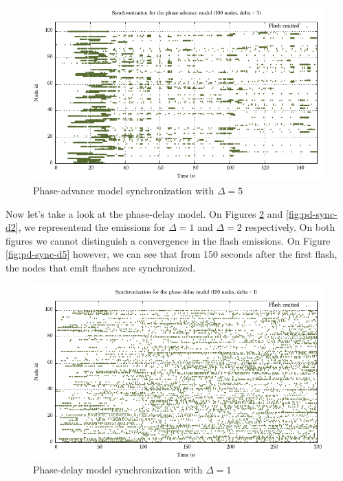 \documentclass[a4paper, 11pt]{article}
\theoremstyle{plain}
\theoremstyle{definition}
\begin{document}
      \begin{figure}[h]
       \centering
       \includegraphics[scale=0.8]{../Plots/Firefly-pa-100nodes-5-3.pdf}
       \caption{Phase-advance model synchronization with $\Delta = 5$}
       \label{fig:pa-sync-d5}
     \end{figure}


     Now let's take a look at the phase-delay model. On Figures \ref{fig:pd-sync-d1} and \ref{fig:pd-sync-d2},
     we representend the emissions for $\Delta = 1$ and $\Delta = 2$ respectively. On both figures we cannot
     distinguish a convergence in the flash emissions. On Figure \ref{fig:pd-sync-d5} however, we can see that
     from 150 seconds after the first flash, the nodes that emit flashes are synchronized. 

     \begin{figure}[h]
       \centering
       \includegraphics[scale=0.8]{../Plots/Firefly-pd-100nodes-1-6.pdf}
       \caption{Phase-delay model synchronization with $\Delta = 1$}
       \label{fig:pd-sync-d1}
     \end{figure}
\end{document}
